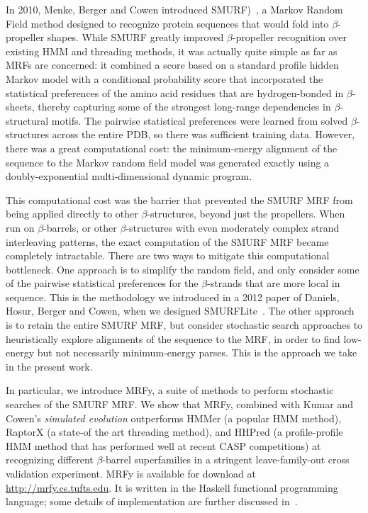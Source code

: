 \documentclass{acm_proc_article-sp}
\begin{document}
In 2010, Menke, Berger and Cowen introduced
SMURF)~\cite{Menke:2010ti}, a Markov Random Field method designed to
recognize protein sequences that would fold into $\beta$-propeller
shapes. 
While SMURF greatly improved $\beta$-propeller recognition over
existing HMM and threading methods, it was actually quite simple as
far as MRFs are concerned: it combined a score based on a standard profile 
hidden Markov model with a conditional probability score that incorporated
the statistical preferences of the amino acid residues that are
hydrogen-bonded in $\beta$-sheets, thereby capturing some of the
strongest long-range dependencies in $\beta$-structural motifs.
The
pairwise statistical preferences were learned from solved
$\beta$-structures across the entire PDB, so there was sufficient
training data. 
However, there was a great computational cost: the
minimum-energy alignment of the sequence to the Markov random field model
was generated exactly using a doubly-exponential multi-dimensional
dynamic program.


This computational cost was the barrier that prevented the SMURF MRF
from being applied directly to other $\beta$-structures, beyond just
the propellers.  
When run on $\beta$-barrels, or other $\beta$-structures with
even moderately complex strand interleaving patterns, the exact
computation of the SMURF MRF became completely intractable. 
There are two ways to mitigate this computational bottleneck. 
One approach is to simplify the random field, and only consider some of the 
pairwise statistical preferences for the $\beta$-strands that are more local in 
sequence.
This is the methodology we introduced in a 2012 paper of Daniels, Hosur, Berger
and Cowen, when we designed SMURFLite~\cite{Daniels:2012dg}. 
The other approach is to retain the entire SMURF MRF, but consider
stochastic search approaches to heuristically explore alignments of the
sequence to the MRF, in order to find low-energy but not necessarily
minimum-energy parses.
This is the approach we take in the present work.

In particular, we introduce MRFy, a suite of methods to perform
stochastic searches of the SMURF MRF. 
We show that MRFy, combined with Kumar and Cowen's {\em simulated evolution\/} 
outperforms HMMer (a popular HMM method), RaptorX (a state-of the art threading 
method), and HHPred (a profile-profile HMM method that has performed well at 
recent CASP competitions) at recognizing different $\beta$-barrel superfamilies
in a stringent leave-family-out cross validation experiment. 
MRFy is available for download at \url{http://mrfy.cs.tufts.edu}. 
It is written in the Haskell functional programming language; some details of 
implementation are further discussed in~\cite{Daniels:2012cm}.
\end{document}
